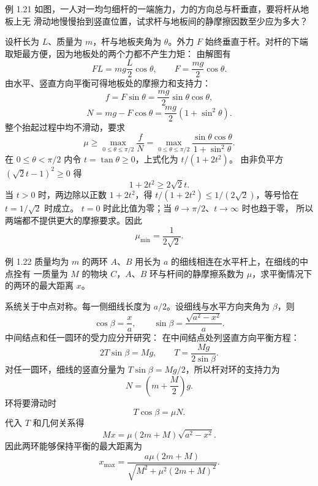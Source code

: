\begin{origexamplebox}{例 1.21}
如图，一人对一均匀细杆的一端施力，力的方向总与杆垂直，要将杆从地板上无
滑动地慢慢抬到竖直位置，试求杆与地板间的静摩擦因数至少应为多大？
\end{origexamplebox}

\begin{xesolution}
设杆长为 $L$、质量为 $m$，杆与地板夹角为 $\theta$。外力 $F$ 始终垂直于杆。对杆的下端
取矩最方便，因为地板处的两个力都不产生力矩：
\soldiagOneTwentyOne
由解图有
\[
  FL=mg\frac L2\cos\theta,
  \qquad
  F=\frac{mg}{2}\cos\theta.
\]
由水平、竖直方向平衡可得地板处的摩擦力和支持力：
\[
  f=F\sin\theta=\frac{mg}{2}\sin\theta\cos\theta,
\]
\[
  N=mg-F\cos\theta
  =\frac{mg}{2}\left(1+\sin^2\theta\right).
\]
整个抬起过程中均不滑动，要求
\[
  \mu\ge\max_{0\le\theta\le\pi/2}\frac fN
  =\max_{0\le\theta\le\pi/2}
  \frac{\sin\theta\cos\theta}{1+\sin^2\theta}.
\]
在 $0\le\theta<\pi/2$ 内令 $t=\tan\theta\ge0$，上式化为 $t/(1+2t^2)$。
由非负平方 $(\sqrt2t-1)^2\ge0$ 得
\[
 1+2t^2\ge2\sqrt2t.
\]
当 $t>0$ 时，两边除以正数 $1+2t^2$，得
$t/(1+2t^2)\le1/(2\sqrt2)$，等号恰在 $t=1/\sqrt2$ 时成立。
$t=0$ 时此比值为零；当 $\theta\to\pi/2$、$t\to\infty$ 时也趋于零，
所以两端都不提供更大的摩擦要求。因此
\[
  \boxed{\mu_{\min}=\frac{1}{2\sqrt2}}.
\]
\end{xesolution}

\begin{origexamplebox}{例 1.22}
质量均为 $m$ 的两环 $A$、$B$ 用长为 $a$ 的细线相连在水平杆上，在细线的中点拴有
一质量为 $M$ 的物块 $C$，$A$、$B$ 环与杆间的静摩擦系数为 $\mu$，求平衡情况下的两环的最大距离
$x$。
\end{origexamplebox}

\begin{xesolution}
系统关于中点对称。每一侧细线长度为 $a/2$。设细线与水平方向夹角为 $\beta$，则
\[
  \cos\beta=\frac xa,
  \qquad
  \sin\beta=\frac{\sqrt{a^2-x^2}}{a}.
\]
中间结点和任一圆环的受力应分开研究：
\soldiagOneTwentyTwo
在中间结点处列竖直方向平衡方程：
\[
  2T\sin\beta=Mg,
  \qquad
  T=\frac{Mg}{2\sin\beta}.
\]
对任一圆环，细线的竖直分量为 $T\sin\beta=Mg/2$，所以杆对环的支持力为
\[
  N=\left(m+\frac M2\right)g.
\]
环将要滑动时
\[
  T\cos\beta=\mu N.
\]
代入 $T$ 和几何关系得
\[
  Mx=\mu(2m+M)\sqrt{a^2-x^2}.
\]
因此两环能够保持平衡的最大距离为
\[
  \boxed{x_{\max}=
  \frac{a\mu(2m+M)}{\sqrt{M^2+\mu^2(2m+M)^2}}}.
\]
\end{xesolution}

